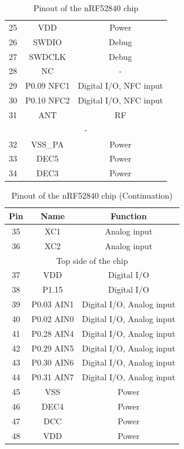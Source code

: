 \begin{table}[H]
\begin{tabular}{|c|c|c|}
        \hline
        25 & VDD & Power \\
        26 & SWDIO & Debug \\
        27 & SWDCLK & Debug \\
        28 & NC & - \\
        29 & P0.09 NFC1 & Digital I/O, NFC input \\
        30 & P0.10 NFC2 & Digital I/O, NFC input \\
        31 & ANT & RF \\
        \hline
        \multicolumn{3}{|c|}{-} \\
        \hline
        32 & VSS\_PA & Power \\
        33 & DEC5 & Power \\
        34 & DEC3 & Power \\
        \hline
    \end{tabular}
    \caption{Pinout of the nRF52840 chip}
    \label{tab:nrf52840_pinout}
\end{table}

\begin{table}[H]
    \centering
    \begin{tabular}{|c|c|c|}
        \hline
        \textbf{Pin} & \textbf{Name} & \textbf{Function} \\
        \hline
        35 & XC1 & Analog input \\
        36 & XC2 & Analog input \\
        \hline
        \multicolumn{3}{|c|}{Top side of the chip} \\
        \hline
        37 & VDD & Digital I/O \\
        38 & P1.15 & Digital I/O \\
        39 & P0.03 AIN1 & Digital I/O, Analog input \\
        40 & P0.02 AIN0 & Digital I/O, Analog input \\
        41 & P0.28 AIN4 & Digital I/O, Analog input \\
        42 & P0.29 AIN5 & Digital I/O, Analog input \\
        43 & P0.30 AIN6 & Digital I/O, Analog input \\
        44 & P0.31 AIN7 & Digital I/O, Analog input \\
        45 & VSS & Power \\
        46 & DEC4 & Power \\
        47 & DCC & Power \\
        48 & VDD & Power \\
        \hline
    \end{tabular}
    \caption{Pinout of the nRF52840 chip (Continuation)}
    \label{tab:nrf52840_pinout_cont}
\end{table}


